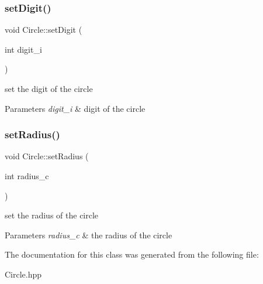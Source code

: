 \subsubsection{\texorpdfstring{set\+Digit()}{setDigit()}}
{\footnotesize\ttfamily void Circle\+::set\+Digit (\begin{DoxyParamCaption}\item[{int}]{digit\+\_\+i }\end{DoxyParamCaption})}

set the digit of the circle 
\begin{DoxyParams}{Parameters}
{\em digit\+\_\+i} & digit of the circle \\
\hline
\end{DoxyParams}
\mbox{\label{class_circle_ae4a8bd93b437b4cf0077483ff84c8626}} 
\subsubsection{\texorpdfstring{set\+Radius()}{setRadius()}}
{\footnotesize\ttfamily void Circle\+::set\+Radius (\begin{DoxyParamCaption}\item[{int}]{radius\+\_\+c }\end{DoxyParamCaption})}

set the radius of the circle 
\begin{DoxyParams}{Parameters}
{\em radius\+\_\+c} & the radius of the circle \\
\hline
\end{DoxyParams}


The documentation for this class was generated from the following file\+:\begin{DoxyCompactItemize}
\item 
Circle.\+hpp\end{DoxyCompactItemize}
